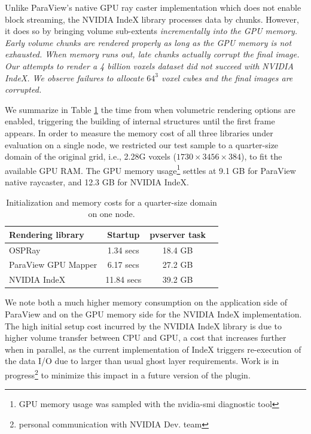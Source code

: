 \documentclass[5p,times]{elsarticle}
\begin{document}
Unlike ParaView's native GPU ray caster implementation which does not enable block
streaming, the NVIDIA IndeX library processes data by chunks. However, it does so
by bringing volume sub-extents \it{incrementally} \rm into the GPU memory.
Early volume chunks are rendered properly as long as the GPU memory is not exhausted.
When memory runs out, late chunks actually corrupt the final image. Our attempts to
render a 4 billion voxels dataset did not succeed with NVIDIA IndeX. We observe failures
to allocate $64^3$ voxel cubes and the final images are corrupted.

We summarize in Table \ref{tab:firstframe-tab} the time from when volumetric rendering options
are enabled, triggering the building of internal structures until the first frame appears.
In order to measure the memory cost of all three libraries under evaluation on a single node,
we restricted our test sample to a quarter-size domain of the original grid, i.e., 2.28G voxels
($ 1730 \times 3456 \times 384 $), to fit the available GPU RAM. The GPU memory
usage\footnote{GPU memory usage was sampled with the nvidia-smi diagnostic tool}
settles at 9.1 GB for ParaView native raycaster, and 12.3 GB for NVIDIA IndeX. 

\begin{table}[htb]
  \centering
  \caption{
    Initialization and memory costs for a quarter-size domain on one node.
  }
  \label{tab:firstframe-tab}

  \begin{tabular}{lccc}
    \hline
    Rendering library & Startup & pvserver task\\
    \hline
    OSPRay & 1.34 secs &  18.4 GB \\
    ParaView GPU Mapper & 6.17 secs &  27.2 GB \\
    NVIDIA IndeX & 11.84 secs &  39.2 GB\\
    \hline

  \end{tabular}
\end{table}

We note both a much higher memory consumption on the application side of ParaView
and on the GPU memory side for the NVIDIA IndeX implementation. The high initial 
setup cost incurred by the NVIDIA IndeX library is due to higher volume transfer
between CPU and GPU, a cost that increases further when in parallel, as the current
implementation of IndeX triggers re-execution of the data I/O due to larger than
usual ghost layer requirements. Work is in progress\footnote{personal communication
with NVIDIA Dev. team} to minimize this impact in a future version of the plugin.
\end{document}
